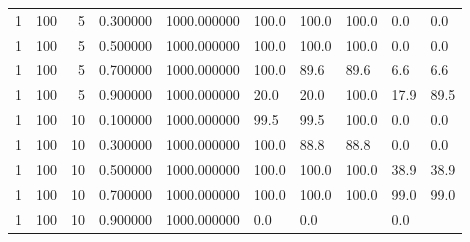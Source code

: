 \begin{tabular}{rrrrrlllll}
1 & 100 & 5 & 0.300000 & 1000.000000 & 100.0 & 100.0 & 100.0 & 0.0 & 0.0 \\
1 & 100 & 5 & 0.500000 & 1000.000000 & 100.0 & 100.0 & 100.0 & 0.0 & 0.0 \\
1 & 100 & 5 & 0.700000 & 1000.000000 & 100.0 & 89.6 & 89.6 & 6.6 & 6.6 \\
1 & 100 & 5 & 0.900000 & 1000.000000 & 20.0 & 20.0 & 100.0 & 17.9 & 89.5 \\
1 & 100 & 10 & 0.100000 & 1000.000000 & 99.5 & 99.5 & 100.0 & 0.0 & 0.0 \\
1 & 100 & 10 & 0.300000 & 1000.000000 & 100.0 & 88.8 & 88.8 & 0.0 & 0.0 \\
1 & 100 & 10 & 0.500000 & 1000.000000 & 100.0 & 100.0 & 100.0 & 38.9 & 38.9 \\
1 & 100 & 10 & 0.700000 & 1000.000000 & 100.0 & 100.0 & 100.0 & 99.0 & 99.0 \\
1 & 100 & 10 & 0.900000 & 1000.000000 & 0.0 & 0.0 &  & 0.0 &  \\
\bottomrule
\end{tabular}
